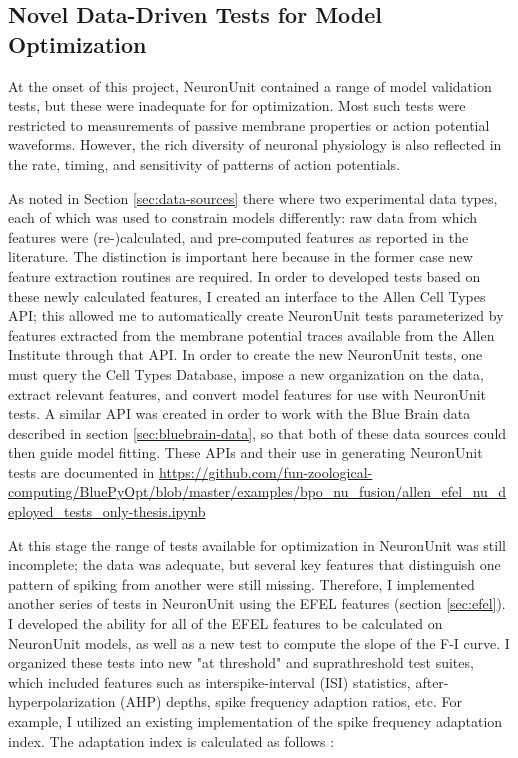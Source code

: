 \subsection{Novel Data-Driven Tests for Model Optimization}
At the onset of this project, NeuronUnit contained a range of model validation tests, but these were inadequate for for optimization.
Most such tests were restricted to measurements of passive membrane properties or action potential waveforms.
However, the rich diversity of neuronal physiology is also reflected in the rate, timing, and sensitivity of patterns of action potentials.

As noted in Section \ref{sec:data-sources} there where two experimental data types, each of which was used to constrain models differently: raw data from which features were (re-)calculated, and pre-computed features as reported in the literature.
The distinction is important here because in the former case new feature extraction routines are required.
In order to developed tests based on these newly calculated features, I created an interface to the Allen Cell Types API; this allowed me to automatically create NeuronUnit tests parameterized by features extracted from the membrane potential traces available from the Allen Institute through that API.
In order to create the new NeuronUnit tests, one must query the Cell Types Database, impose a new organization on the data, extract relevant features, and convert model features for use with NeuronUnit tests.
A similar API was created in order to work with the Blue Brain data described in section \ref{sec:bluebrain-data}, so that both of these data sources could then guide model fitting.
These APIs and their use in generating NeuronUnit tests are documented in \url{https://github.com/fun-zoological-computing/BluePyOpt/blob/master/examples/bpo_nu_fusion/allen_efel_nu_deployed_tests_only-thesis.ipynb}

At this stage the range of tests available for optimization in NeuronUnit was still incomplete; the data was adequate, but several key features that distinguish one pattern of spiking from another were still missing. Therefore, I implemented another series of tests in NeuronUnit using the EFEL features (section \ref{sec:efel}).
I developed the ability for all of the EFEL features to be calculated on NeuronUnit models, as well as a new test to compute the slope of the F-I curve.
I organized these tests into new "at threshold" and suprathreshold test suites, which included features such as
interspike-interval (ISI) statistics, after-hyperpolarization (AHP) depths, spike frequency adaption ratios, etc.
For example, I utilized an existing implementation of the spike frequency adaptation index. The adaptation index is calculated as follows \citep{EFEL}:

